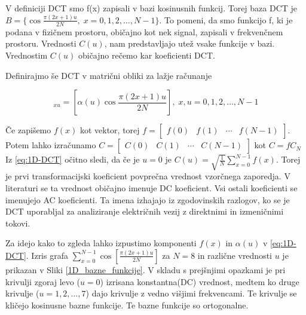 \documentclass[a4paper,12pt,openright]{book}
\begin{document}
V definiciji DCT smo f(x) zapisali v bazi kosinusnih funkcij. Torej baza DCT je \(B = \{\cos\frac{\pi(2x+1)u}{2N}, \; x = 0,1,2,\ldots,N-1 \}\). To pomeni, da smo funkcijo f, ki je podana v fizičnem prostoru, običajno kot nek signal, zapisali v frekvenčnem prostoru. Vrednosti \(C(u)\), nam predstavljajo utež vsake funkcije v bazi. Vrednostim \(C(u)\) običajno rečemo kar koeficienti DCT.

Definirajmo še DCT v matrični obliki za lažje računanje

\begin{equation}
[C_N]_{xu} = \left[\alpha(u) \cos\frac{\pi(2x+1)u}{2N}\right],  \; 
x,u = 0,1,2,\ldots,N-1
\label{eq:1D_DCT_matrika}
\end{equation}

Če zapišemo \(f(x)\) kot vektor, torej \(f = 
\begin{bmatrix} 
f(0) & f(1) & \cdots & f(N-1)
\end{bmatrix}.
\)
Potem lahko izračunamo \(C =  
\begin{bmatrix} 
C(0) & C(1) & \cdots & C(N-1)
\end{bmatrix}
\)
kot \(C = fC_N\)
Iz \ref{eq:1D-DCT} očitno sledi, da če je \(u = 0\) je 
\(C(u) = \sqrt{\frac{1}{N}} \sum_{x=0}^{N-1} f(x)\). Torej je prvi transformacijski koeficient povprečna vrednost vzorčnega zaporedja. V literaturi se ta vrednost običajno imenuje DC koeficient. Vsi ostali koeficienti se imenujejo AC koeficienti. Ta imena izhajajo iz zgodovinskih razlogov, ko se je DCT uporabljal za analiziranje električnih vezij z direktnimi in izmeničnimi tokovi. \par
Za idejo kako to zgleda lahko izpustimo komponenti \(f(x)\) in \(\alpha(u)\) v \ref{eq:1D-DCT}. Izris grafa  \(\sum_{x=0}^{N-1}\cos[\frac{\pi(2x+1)u}{2N}]\) za \(N=8\) in različne vrednosti \(u\) je prikazan v Sliki \ref{1D_bazne_funkcije}. V skladu s prejšnjimi opazkami je pri krivulji zgoraj levo (\(u=0\)) izrisana konstantna(DC) vrednost, medtem ko druge krivulje (\(u=1,2,\ldots,7\)) dajo krivulje z vedno višjimi frekvencami. Te krivulje se kličejo kosinusne bazne funkcije. Te bazne funkcije so ortogonalne. 
\end{document}
